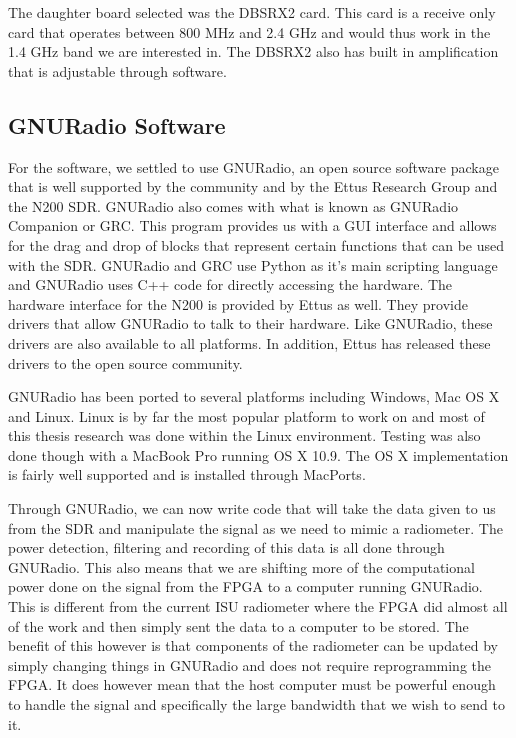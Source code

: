 The daughter board selected was the DBSRX2 card.  This card is a receive only card that operates between 800 MHz and 2.4 GHz and would thus work in the 1.4 GHz band we are interested in.  The DBSRX2 also has built in amplification that is adjustable through software.

\subsection{GNURadio Software}

For the software, we settled to use GNURadio, an open source software package that is well supported by the community and by the Ettus Research Group and the N200 SDR.  GNURadio also comes with what is known as GNURadio Companion or GRC.  This program provides us with a GUI interface and allows for the drag and drop of blocks that represent certain functions that can be used with the SDR.  GNURadio and GRC use Python as it's main scripting language and GNURadio uses C++ code for directly accessing the hardware.  The hardware interface for the N200 is provided by Ettus as well.  They provide drivers that allow GNURadio to talk to their hardware.  Like GNURadio, these drivers are also available to all platforms.  In addition, Ettus has released these drivers to the open source community.

GNURadio has been ported to several platforms including Windows, Mac OS X and Linux.  Linux is by far the most popular platform to work on and most of this thesis research was done within the Linux environment.  Testing was also done though with a MacBook Pro running OS X 10.9.  The OS X implementation is fairly well supported and is installed through MacPorts.  

Through GNURadio, we can now write code that will take the data given to us from the SDR and manipulate the signal as we need to mimic a radiometer.  The power detection, filtering and recording of this data is all done through GNURadio.  This also means that we are shifting more of the computational power done on the signal from the FPGA to a computer running GNURadio.  This is different from the current ISU radiometer where the FPGA did almost all of the work and then simply sent the data to a computer to be stored.  The benefit of this however is that components of the radiometer can be updated by simply changing things in GNURadio and does not require reprogramming the FPGA.  It does however mean that the host computer must be powerful enough to handle the signal and specifically the large bandwidth that we wish to send to it.  


